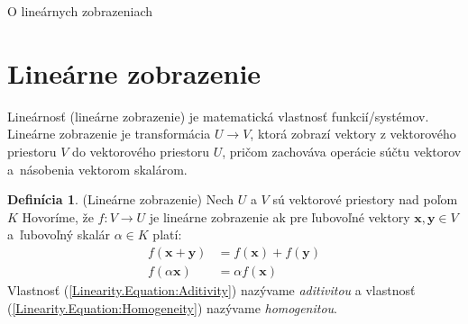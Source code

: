 \documentclass[a4paper, 10pt, ]{article}
\newcommand{\bm}[1]{\mathbf{#1}}
\theoremstyle{definition}
\newtheorem{definition}{Definícia}[section]
\begin{document}
\begin{flushleft}
	O lineárnych zobrazeniach
\end{flushleft}

\bigskip

\normalsize
\normalfont




\section{Lineárne zobrazenie}
\label{Linearity}

Lineárnosť (lineárne zobrazenie) je matematická vlastnosť funkcií/systémov. Lineárne zobrazenie je transformácia $U \rightarrow V$, ktorá zobrazí vektory z vektorového priestoru $V$ do vektorového priestoru $U$, pričom zachováva operácie súčtu vektorov a~násobenia vektorom skalárom.

\begin{definition}(Lineárne zobrazenie)
    Nech $U$ a $V$ sú vektorové priestory nad poľom $K$ Hovoríme, že $f: V \rightarrow U$ je lineárne zobrazenie ak pre ľubovoľné vektory $\bm{x}, \bm{y} \in V$ a~ľubovoľný skalár $\alpha \in K$ platí:
    \begin{subequations}
        \begin{align}
            \label{Linearity.Equation:Aditivity}
            f(\bm{x} + \bm{y}) &= f(\bm{x}) + f(\bm{y}) \\[6pt]
            \label{Linearity.Equation:Homogeneity}
            f(\alpha \bm{x})   &= \alpha f(\bm{x})
        \end{align}
    \end{subequations}
    Vlastnosť (\ref{Linearity.Equation:Aditivity}) nazývame \textit{aditivitou} a vlastnosť (\ref{Linearity.Equation:Homogeneity}) nazývame \textit{homogenitou}.
\end{definition}
\end{document}
